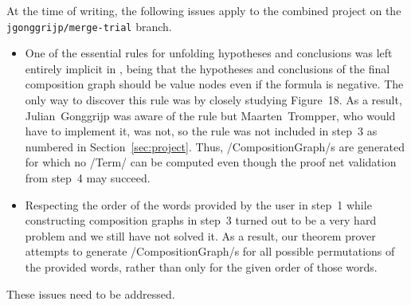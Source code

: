 \documentclass[12pt,a4paper]{article}
\begin{document}
At the time of writing, the following issues apply to the combined project on the \texttt{jgonggrijp/merge-trial} branch.
\begin{itemize}
    \item One of the essential rules for unfolding hypotheses and conclusions was left entirely implicit in \cite{mm12}, being that the hypotheses and conclusions of the final composition graph should be value nodes even if the formula is negative. The only way to discover this rule was by closely studying Figure~18. As a result, Julian~Gonggrijp was aware of the rule but Maarten~Trompper, who would have to implement it, was not, so the rule was not included in step~3 as numbered in Section~\ref{sec:project}. Thus, \hs/CompositionGraph/s are generated for which no \hs/Term/ can be computed even though the proof net validation from step~4 may succeed.
    \item Respecting the order of the words provided by the user in step~1 while constructing composition graphs in step~3 turned out to be a very hard problem and we still have not solved it. As a result,  our theorem prover attempts to generate \hs/CompositionGraph/s for all possible permutations of the provided words, rather than only for the given order of those words.
\end{itemize}
These issues need to be addressed.
\end{document}
